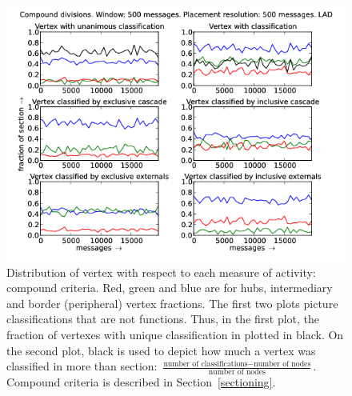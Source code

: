 \documentclass[%
 aip,
 jmp,%
 amsmath,amssymb,
 reprint,%
]{revtex4-1}
\begin{document}
\begin{figure}[hbtp] 
   \centering
        \includegraphics[width=\textwidth]{figs/LAD/500_2}
    \caption{Distribution of vertex with respect to each measure of activity: compound criteria. Red, green and blue are for hubs, intermediary and border (peripheral) vertex fractions. The first two plots picture classifications that are not functions. Thus, in the first plot, the fraction of vertexes with unique classification in plotted in black. On the second plot, black is used to depict how much a vertex was classified in more than section: $\frac{\text{number of classifications} - \text{number of nodes}}{\text{number of nodes}}$. Compound criteria is described in Section~\ref{sectioning}.}
    \label{fig:lad500_}
\end{figure}
\end{document}

